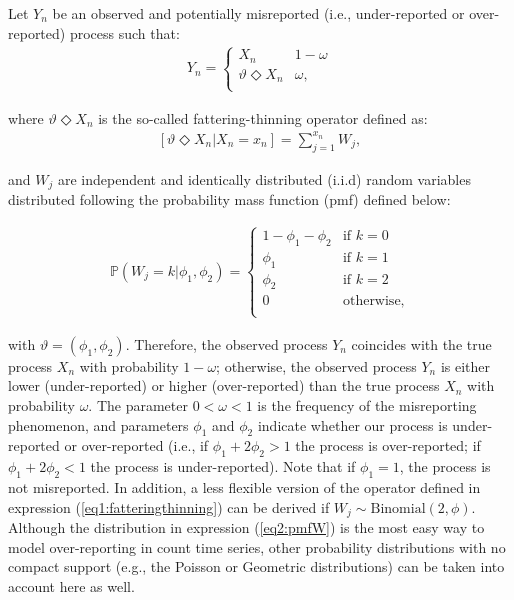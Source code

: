 \documentclass[12pt,twoside, A4paper]{article}
\begin{document}
Let $Y_n$ be an observed and potentially misreported (i.e., under-reported or over-reported) process such that:
\begin{align}\label{eq0:modelfatthin}
Y_n=\begin{cases} 
X_n &  1-\omega \\
\vartheta \Diamond X_n & \omega, \\
\end{cases}
\end{align}

\noindent where $\vartheta \Diamond X_n$ is the so-called fattering-thinning operator defined as:
\begin{align}\label{eq1:fatteringthinning}
\left[\vartheta \Diamond X_n|X_n=x_n\right]=\sum_{j=1}^{x_n}W_j,
\end{align}

\noindent and $W_j$ are independent and identically distributed (i.i.d) random variables distributed following the probability mass function (pmf) defined below:

\begin{align}\label{eq2:pmfW}
\mathbb{P}(W_j=k|\phi_1,\phi_2)=\begin{cases} 
1-\phi_1-\phi_2 & \textrm{if } k=0  \\
\phi_1 & \textrm{if } k=1  \\
\phi_2 & \textrm{if } k=2  \\
0 & \textrm{otherwise}, \\
\end{cases}
\end{align}

\noindent with $\vartheta=(\phi_1,\phi_2)$. Therefore, the observed process $Y_n$ coincides with the true process $X_n$ with probability $1-\omega$; otherwise, the observed process $Y_n$ is either lower (under-reported) or higher (over-reported) than the true process $X_n$ with probability $\omega$. The parameter $0<\omega<1$ is the frequency of the misreporting phenomenon, and parameters $\phi_1$ and $\phi_2$ indicate whether our process is under-reported or over-reported (i.e., if $\phi_1+2\phi_2>1$ the process is over-reported; if $\phi_1+2\phi_2<1$ the process is under-reported). Note that if $\phi_1=1$, the process is not misreported. In addition, a less flexible version of the operator defined in expression (\ref{eq1:fatteringthinning}) can be derived if $W_j \sim \textrm{Binomial}(2,\phi)$. Although the distribution in expression (\ref{eq2:pmfW}) is the most easy way to model over-reporting in count time series, other probability distributions with no compact support (e.g., the Poisson or Geometric distributions) can be taken into account here as well. 
\end{document}
